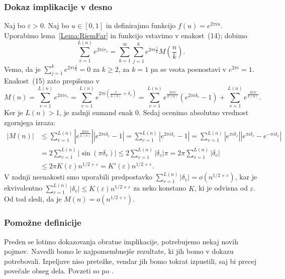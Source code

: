 \documentclass[mat1]{fmfdelo}
\begin{document}
\subsubsection{Dokaz implikacije v desno}
%
Naj bo $\varepsilon > 0$. Naj bo $u \in [0,1]$ in definirajmo funkcijo $f(u) = e^{2\pi iu}$. Uporabimo lema~\ref{Lema:RiemFar} in funkcijo vstavimo v enakost~(14); dobimo
\begin{equation}
	\sum_{v=1}^{L(n)} e^{2\pi i r_{v}} = \sum_{k=1}^{\infty} \sum_{j=1}^{k} e^{2\pi i \frac{j}{k}} M \left(\frac{n}{k} \right).
\end{equation}
Vemo, da je $\sum_{j=1}^{k} e^{2\pi i \frac{j}{k}} = 0$ za $k \geq 2$, za $k=1$ pa se vsota poenostavi v $e^{2\pi i} = 1$.
Enakost~(15) zato prepišemo v 
\[ M(n) = \sum_{v=1}^{L(n)} e^{2\pi i r_{v}} = \sum_{v=1}^{L(n)} e^{2\pi i \left(\frac{v}{L(n)} + \delta_{v} \right)} 
	   = \sum_{v=1}^{L(n)} e^{ \frac{2\pi i v}{L(n)} } \left(e^{2\pi i \delta_{v}} - 1 \right) + \sum_{v=1}^{L(n)} e^{ \frac{2\pi iv}{L(n)} }. \]
Ker je $L(n) > 1$, je zadnji sumand enak $0$. Sedaj ocenimo absolutno vrednost zgornjega izraza:
\begin{align*} 
|M(n)| &\leq \sum_{v=1}^{L(n)} \left|e^{ \frac{2\pi i v}{L(n)} } \right| \left|e^{2\pi i \delta_{v}} - 1 \right| 
	= \sum_{v=1}^{L(n)} \left|e^{2\pi i \delta_{v}} - 1 \right|
	= \sum_{v=1}^{L(n)} \left|e^{\pi i \delta_{v} } \right| \left|e^{\pi i \delta_{v}} - e^{-\pi i \delta_{v}}\right| \\
	&= 2 \sum_{v=1}^{L(n)} |\sin(\pi \delta_{v})| \leq 2 \sum_{v=1}^{L(n)} |\delta_{v}| \pi = 2 \pi \sum_{v=1}^{L(n)} |\delta_{v}| \\
	&\leq 2 \pi K(\varepsilon) n^{1/2 + \varepsilon} = K'(\varepsilon) n^{1/2 + \varepsilon}.
\end{align*}
V zadnji neenakosti smo uporabili predpostavko $ \sum_{v=1}^{L(n)}|\delta_{v}| = o(n^{1/2+\varepsilon}) $, kar je ekvivalentno 
$ \sum_{v=1}^{L(n)}|\delta_{v}| \leq K(\varepsilon) n^{1/2+\varepsilon}$ za neko konstano $K$, ki je odvisna od $\varepsilon$.
Od tod sledi, da je $M(n) = o(n^{1/2 + \varepsilon})$.

\subsubsection{Pomožne definicije}
Preden se lotimo dokazovanja obratne implikacije, potrebujemo nekaj novih pojmov. Navedli bomo le najpomembnejše rezultate, ki jih bomo v dokazu potrebovali. Izpeljave niso pretežke, vendar jih bomo tokrat izpustili, saj bi precej povečale obseg dela. Povzeti so po \cite[poglavje 6.2]{zetafunction}.
\end{document}
